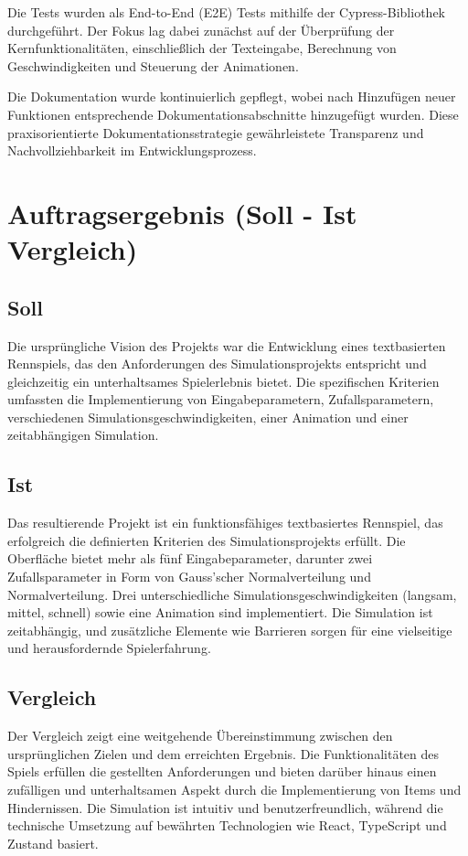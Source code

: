 \documentclass[hidelinks,12pt]{article}
\begin{document}
Die Tests wurden als End-to-End (E2E) Tests mithilfe der Cypress-Bibliothek durchgeführt. Der Fokus lag dabei zunächst auf der Überprüfung der Kernfunktionalitäten, einschließlich der Texteingabe, Berechnung von Geschwindigkeiten und Steuerung der Animationen.

Die Dokumentation wurde kontinuierlich gepflegt, wobei nach Hinzufügen neuer Funktionen entsprechende Dokumentationsabschnitte hinzugefügt wurden. Diese praxisorientierte Dokumentationsstrategie gewährleistete Transparenz und Nachvollziehbarkeit im Entwicklungsprozess.

\section{Auftragsergebnis (Soll - Ist Vergleich)}

\subsection{Soll}
Die ursprüngliche Vision des Projekts war die Entwicklung eines textbasierten Rennspiels, das den Anforderungen des Simulationsprojekts entspricht und gleichzeitig ein unterhaltsames Spielerlebnis bietet. Die spezifischen Kriterien umfassten die Implementierung von Eingabeparametern, Zufallsparametern, verschiedenen Simulationsgeschwindigkeiten, einer Animation und einer zeitabhängigen Simulation.

\subsection{Ist}
Das resultierende Projekt ist ein funktionsfähiges textbasiertes Rennspiel, das erfolgreich die definierten Kriterien des Simulationsprojekts erfüllt. Die Oberfläche bietet mehr als fünf Eingabeparameter, darunter zwei Zufallsparameter in Form von Gauss'scher Normalverteilung und Normalverteilung. Drei unterschiedliche Simulationsgeschwindigkeiten (langsam, mittel, schnell) sowie eine Animation sind implementiert. Die Simulation ist zeitabhängig, und zusätzliche Elemente wie Barrieren sorgen für eine vielseitige und herausfordernde Spielerfahrung.

\subsection{Vergleich}
Der Vergleich zeigt eine weitgehende Übereinstimmung zwischen den ursprünglichen Zielen und dem erreichten Ergebnis. Die Funktionalitäten des Spiels erfüllen die gestellten Anforderungen und bieten darüber hinaus einen zufälligen und unterhaltsamen Aspekt durch die Implementierung von Items und Hindernissen. Die Simulation ist intuitiv und benutzerfreundlich, während die technische Umsetzung auf bewährten Technologien wie React, TypeScript und Zustand basiert.
\end{document}
